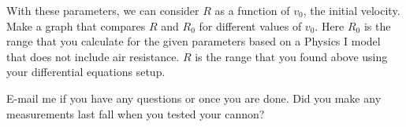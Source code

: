 \documentclass[addpoints, 12pt]{exam}
\begin{document}
\bigskip
With these parameters, we can consider $R$ as a function of $v_0$, the initial velocity.  Make a graph that compares $R$ and $R_0$ for different values of $v_0$.  Here $R_0$ is the range that you calculate for the given parameters based on a Physics I model that does not include air resistance.  $R$ is the range that you found above using your differential equations setup.

\bigskip
E-mail me if you have any questions or once you are done.  Did you make any measurements last fall when you tested your cannon?
\end{document}
